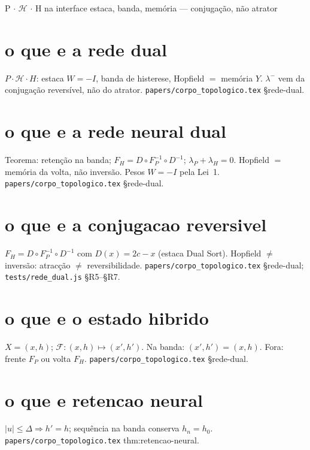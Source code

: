 \documentclass[11pt,a4paper]{article}
\newcommand{\code}[1]{\texttt{\small #1}}
\begin{document}
       {P $\cdot$ $\mathcal{H}$ $\cdot$ H na interface}
       {estaca, banda, memória --- conjugação, não atrator}
\maketitle
\begin{abstract}
Pares curtos do Teorema da Rede Dual.
Detalhe: \code{papers/corpo\_topologico.tex} \S rede-dual.
UI: \code{app/src/rede\_dual.js}; medidor \code{tests/rede\_dual.js}.
\end{abstract}

\section{o que e a rede dual}
$P\cdot\mathcal{H}\cdot H$: estaca $W=-I$, banda de histerese, Hopfield $=$ memória $Y$.
$\lambda^{-}$ vem da conjugação reversível, não do atrator.
\code{papers/corpo\_topologico.tex} \S rede-dual.

\section{o que e a rede neural dual}
Teorema: retenção na banda; $F_H=D\circ F_P^{-1}\circ D^{-1}$; $\lambda_P+\lambda_H=0$.
Hopfield $=$ memória da volta, não inversão. Pesos $W=-I$ pela Lei~1.
\code{papers/corpo\_topologico.tex} \S rede-dual.

\section{o que e a conjugacao reversivel}
$F_H=D\circ F_P^{-1}\circ D^{-1}$ com $D(x)=2c-x$ (estaca Dual Sort).
Hopfield $\neq$ inversão: atracção $\neq$ reversibilidade.
\code{papers/corpo\_topologico.tex} \S rede-dual; \code{tests/rede\_dual.js} §R5--§R7.

\section{o que e o estado hibrido}
$X=(x,h)$; $\mathcal{F}\colon(x,h)\mapsto(x',h')$.
Na banda: $(x',h')=(x,h)$. Fora: frente $F_P$ ou volta $F_H$.
\code{papers/corpo\_topologico.tex} \S rede-dual.

\section{o que e retencao neural}
$|u|\le\Delta\Rightarrow h'=h$; sequência na banda conserva $h_n=h_0$.
\code{papers/corpo\_topologico.tex} thm:retencao-neural.
\end{document}
